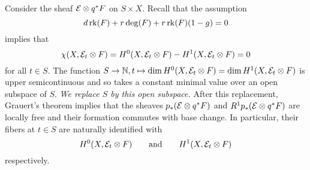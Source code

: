 \documentclass[letterpaper,12pt]{article}
\theoremstyle{remark}
\begin{document}
Consider the sheaf $\mathcal{E} \otimes q^*F$ on $S \times X$. Recall that the assumption
\[ d \operatorname{\mathrm{rk}}(F) + r \deg(F) + r \operatorname{\mathrm{rk}}(F) (1-g) = 0 \]
implies that 
\[ \chi(X, \mathcal{E}_t \otimes F) = H^0(X, \mathcal{E}_t \otimes F) - H^1(X, \mathcal{E}_t \otimes F) = 0 \] 
for all $t \in S$. The function $S \to \mathbb{N}, t \mapsto \dim H^0(X, \mathcal{E}_t \otimes F) = \dim H^1(X, \mathcal{E}_t \otimes F)$ is upper semicontinuous and so takes a constant minimal value over an open subspace of $S$. \emph{We replace $S$ by this open subspace.} After this replacement, Grauert's theorem implies that the sheaves $p_*(\mathcal{E} \otimes q^*F)$ and $R^1 p_*(\mathcal{E} \otimes q^*F)$ are locally free and their formation commutes with base change. In particular, their fibers at $t \in S$ are naturally identified with 
\[ H^0(X, \mathcal{E}_t \otimes F) \qquad \mathrm{and} \qquad H^1(X, \mathcal{E}_t \otimes F) \] respectively.
\end{document}
